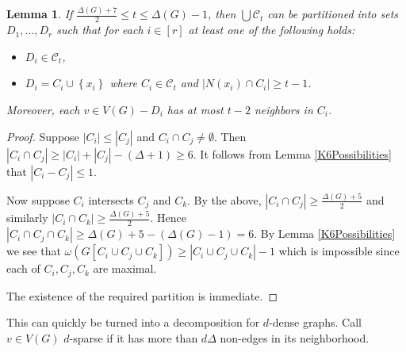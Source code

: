 \documentclass[12pt]{amsart}
\theoremstyle{plain}
\newtheorem{lem}[thm]{Lemma}
\theoremstyle{definition}
\theoremstyle{plain}
\newcommand{\fancy}[1]{\mathcal{#1}}
\newcommand{\CC}{\fancy{C}}
\newcommand{\set}[1]{\left\{ #1 \right\}}
\newcommand{\card}[1]{\left|#1\right|}
\newcommand{\irange}[1]{\left[#1\right]}
\begin{document}
\begin{lem}\label{partition}
If $\frac{\Delta(G) + 7}{2} \leq t \leq \Delta(G) - 1$, then $\bigcup \CC_t$ can be
partitioned into sets $D_1, \ldots, D_r$ such that for each $i \in \irange{r}$
at least one of the following holds:
\begin{itemize}
  \item $D_i \in \CC_t$,
  \item $D_i = C_i \cup \set{x_i}$ where $C_i \in \CC_t$ and $\card{N(x_i) \cap
  C_i} \geq t-1$.
\end{itemize}
Moreover, each $v \in V(G) - D_i$ has at most $t-2$ neighbors in $C_i$.
\end{lem}
\begin{proof}
Suppose $\card{C_i} \leq \card{C_j}$ and $C_i \cap C_j \neq \emptyset$. 
Then $\card{C_i \cap C_j} \geq \card{C_i} + \card{C_j} - (\Delta + 1) \geq 6$.  It follows from Lemma
\ref{K6Possibilities} that $\card{C_i - C_j} \leq 1$.

Now suppose $C_i$ intersects $C_j$ and $C_k$.  By the above,
$\card{C_i \cap C_j} \geq \frac{\Delta(G) + 5}{2}$ and similarly $\card{C_i \cap
C_k} \geq \frac{\Delta(G) + 5}{2}$.  Hence $\card{C_i \cap C_j \cap C_k} \geq
\Delta(G) + 5 - (\Delta(G) - 1) = 6$.  By Lemma \ref{K6Possibilities} we see that $\omega(G[C_i \cup C_j \cup C_k]) \geq \card{C_i \cup C_j \cup C_k} - 1$ which is impossible since each of $C_i, C_j, C_k$ are maximal.

\smallskip

\noindent The existence of the required partition is immediate. 
\end{proof}

This can quickly be turned into a decomposition for $d$-dense graphs. Call $v \in V(G)$ $d$-sparse if it has more than $d\Delta$ non-edges in its neighborhood. 
\end{document}
